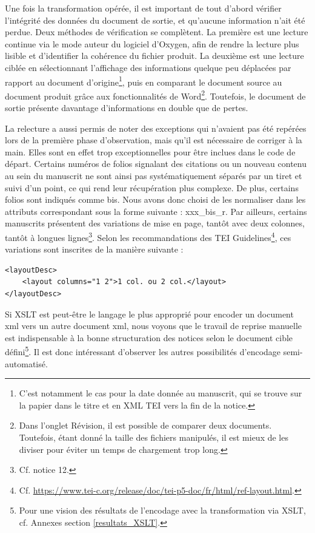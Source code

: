 \documentclass[a4paper,12pt,twoside]{book}
\begin{document}
Une fois la transformation opérée, il est important de tout d'abord vérifier l'intégrité des données du document de sortie, et qu'aucune information n'ait été perdue. Deux méthodes de vérification se complètent. La première est une lecture continue via le mode auteur du logiciel d'Oxygen, afin de rendre la lecture plus lisible et d'identifier la cohérence du fichier produit. La deuxième est une lecture ciblée en sélectionnant l'affichage des informations quelque peu déplacées par rapport au document d'origine\footnote{C'est notamment le cas pour la date donnée au manuscrit, qui se trouve sur la papier dans le titre et en XML TEI vers la fin de la notice.}, puis en comparant le document source au document produit grâce aux fonctionnalités de Word\footnote{Dans l'onglet \og Révision\fg{}, il est possible de comparer deux documents. Toutefois, étant donné la taille des fichiers manipulés, il est mieux de les diviser pour éviter un temps de chargement trop long.}. Toutefois, le document de sortie présente davantage d'informations en double que de pertes. 

La relecture a aussi permis de noter des exceptions qui n'avaient pas été repérées lors de la première phase d'observation, mais qu'il est nécessaire de corriger à la main. Elles sont en effet trop exceptionnelles pour être inclues dans le code de départ. Certains numéros de folios signalant des citations ou un nouveau contenu au sein du manuscrit ne sont ainsi pas systématiquement séparés par un tiret et suivi d'un point, ce qui rend leur récupération plus complexe. 
De plus, certains folios sont indiqués comme \og bis\fg{}. Nous avons donc choisi de les normaliser dans les attributs correspondant sous la forme suivante : \og xxx\_bis\_r\fg{}.
Par ailleurs, certains manuscrits présentent des variations de mise en page, tantôt avec deux colonnes, tantôt à longues lignes\footnote{Cf. notice 12.}. Selon les recommandations des TEI Guidelines\footnote{Cf. \url{https://www.tei-c.org/release/doc/tei-p5-doc/fr/html/ref-layout.html}.}, ces variations sont inscrites de la manière suivante : 
\begin{verbatim}
<layoutDesc>
    <layout columns="1 2">1 col. ou 2 col.</layout>
</layoutDesc>
\end{verbatim}

Si XSLT est peut-être le langage le plus approprié pour encoder un document xml vers un autre document xml, nous voyons que le travail de reprise manuelle est indispensable à la bonne structuration des notices selon le document cible défini\footnote{Pour une vision des résultats de l'encodage avec la transformation via XSLT, cf. Annexes section \ref{resultats_XSLT}.}. Il est donc intéressant d'observer les autres possibilités d'encodage semi-automatisé. 
	
\end{document}

